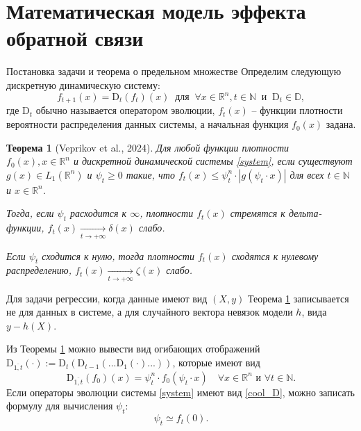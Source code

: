 \documentclass[aspectratio=169]{beamer}
\newtheorem{theorem_rus}{Теорема}
\begin{document}
\section{Математическая модель эффекта обратной связи}
    \begin{frame}{Постановка задачи и теорема о предельном множестве}
        \footnotesize
        \vspace{-2mm}
        Определим следующую дискретную динамическую систему:
        \begin{equation}
            \label{system}
            f_{t+1}(x) = \text{D}_t(f_t)(x) ~ \text{ для } ~ \forall x \in \mathbb{R}^n, t \in \mathbb{N} ~\text{ и } ~ \text{D}_t \in \mathbb{D},
        \end{equation}
        где $\text{D}_t$ обычно называется оператором эволюции, $f_t(x)$ -- функции плотности вероятности распределения данных системы, а начальная функция $f_0(x)$ задана. 
        \vspace{-2mm}
        \begin{theorem_rus}[Veprikov et al., 2024] \label{delta}
        \vspace{-3mm}
            Для любой функции плотности $f_0(x), x \in \mathbb{R}^n$ и дискретной динамической системы \eqref{system}, если существуют $ g(x) \in L_1\left(\mathbb{R}^n\right)$ и $\psi_t \geq 0$ такие, что $f_t\left(x\right) \leq \psi_t^n \cdot |g(\psi_t \cdot x)|$ для всех $t \in \mathbb{N}$ и $x \in \mathbb{R}^n$.

            Тогда, если $\psi_t$ расходится к $\infty$, плотности $f_t(x)$ стремятся к дельта-функции, $f_t(x) \underset{t \to +\infty}{\longrightarrow} \delta(x)$ слабо.  

            Если $\psi_t$ сходится к нулю, тогда плотности $f_t(x)$ сходятся к нулевому распределению, $f_t(x) \underset{t \to +\infty}{\longrightarrow} \zeta(x)$ слабо.
        \end{theorem_rus}
        Для задачи регрессии, когда данные имеют вид $(X, y)$ Теорема \ref{delta} записывается не для данных в системе, а для случайного вектора невязок модели $h$, вида $y - h(X)$.
        
        Из Теоремы \ref{delta} можно вывести вид огибающих отображений $\text{D}_{\overline{1, t}}(\cdot) := \text{D}_t(\text{D}_{t-1} ( ... \text{D}_1( \cdot ) ... ))$, которые имеют вид
        \begin{equation} \label{cool_D}
            \text{D}_{\overline{1, t}}(f_0)(x) = \psi_t^n \cdot f_0(\psi_t \cdot x) \quad \forall x \in \mathbb{R}^n \text{ и } \forall t \in \mathbb{N}.
        \end{equation}
        Если операторы эволюции системы \eqref{system} имеют вид \eqref{cool_D}, можно записать формулу для вычисления $\psi_t$:
        \begin{equation}
            \psi_t \simeq f_t(0) .
        \end{equation}
        
    \end{frame}
    
\end{document}
